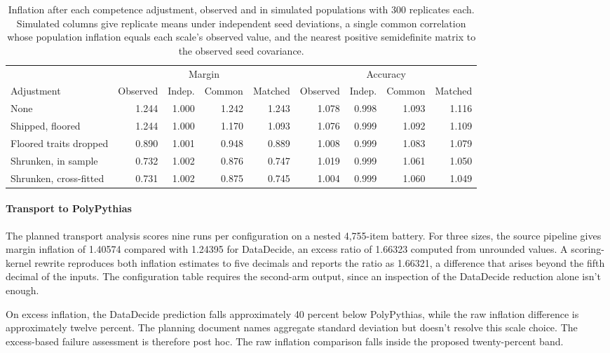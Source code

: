 \begin{table}[h]
\centering
\small
\caption{Inflation after each competence adjustment, observed and in simulated populations with 300 replicates each. Simulated columns give replicate means under independent seed deviations, a single common correlation whose population inflation equals each scale's observed value, and the nearest positive semidefinite matrix to the observed seed covariance.}
\label{tab:proxy}
\setlength{\tabcolsep}{3pt}
\begin{tabular}{lrrrrrrrr}
\toprule
& \multicolumn{4}{c}{Margin} & \multicolumn{4}{c}{Accuracy} \\
\cmidrule(lr){2-5}\cmidrule(lr){6-9}
Adjustment & Observed & Indep. & Common & Matched & Observed & Indep. & Common & Matched \\
\midrule
None & 1.244 & 1.000 & 1.242 & 1.243 & 1.078 & 0.998 & 1.093 & 1.116 \\
Shipped, floored & 1.244 & 1.000 & 1.170 & 1.093 & 1.076 & 0.999 & 1.092 & 1.109 \\
Floored traits dropped & 0.890 & 1.001 & 0.948 & 0.889 & 1.008 & 0.999 & 1.083 & 1.079 \\
Shrunken, in sample & 0.732 & 1.002 & 0.876 & 0.747 & 1.019 & 0.999 & 1.061 & 1.050 \\
Shrunken, cross-fitted & 0.731 & 1.002 & 0.875 & 0.745 & 1.004 & 0.999 & 1.060 & 1.049 \\
\bottomrule
\end{tabular}
\end{table}


\paragraph{Transport to PolyPythias}\label{app:transport}
The planned transport analysis scores nine runs per configuration on a nested 4,755-item battery. For three sizes, the source pipeline gives margin inflation of 1.40574 compared with 1.24395 for DataDecide, an excess ratio of 1.66323 computed from unrounded values. A scoring-kernel rewrite reproduces both inflation estimates to five decimals and reports the ratio as 1.66321, a difference that arises beyond the fifth decimal of the inputs. The configuration table requires the second-arm output, since an inspection of the DataDecide reduction alone isn't enough.

On excess inflation, the DataDecide prediction falls approximately 40 percent below PolyPythias, while the raw inflation difference is approximately twelve percent. The planning document names aggregate standard deviation but doesn't resolve this scale choice. The excess-based failure assessment is therefore post hoc. The raw inflation comparison falls inside the proposed twenty-percent band.

